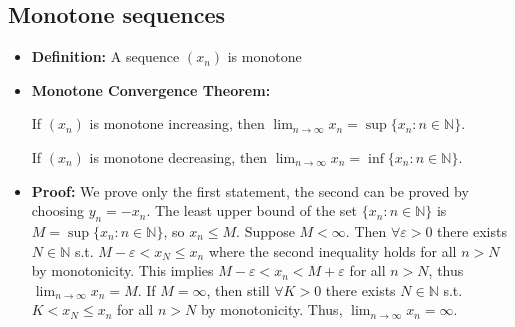\documentclass{article}
\begin{document}
\subsection{Monotone sequences}
    \begin{itemize}
        \item \textbf{Definition:} A sequence $(x_n)$ is monotone
        \item \textbf{Monotone Convergence Theorem:}
        
        If $(x_n)$ is monotone increasing, then $\displaystyle \lim_{n\to\infty} x_n = \sup\{x_n : n \in \mathbb N\}$.

        If $(x_n)$ is monotone decreasing, then $\displaystyle \lim_{n\to\infty} x_n = \inf\{x_n : n \in \mathbb N\}$.
        \item \textbf{Proof:} We prove only the first statement, the second can be proved by choosing $y_n = -x_n$. The least upper bound of the set $\{x_n:n \in \mathbb N\}$ is $M = \sup\{x_n:n \in \mathbb N\}$, so $x_n \le M$. Suppose $M < \infty$. Then $\forall \varepsilon > 0$ there exists $N \in \mathbb N$ s.t. $M - \varepsilon < x_N \le x_n$ where the second inequality holds for all $n > N$ by monotonicity. This implies $M - \varepsilon < x_n < M + \varepsilon$ for all $n > N$, thus $\lim_{n\to\infty} x_n = M$. If $M = \infty$, then still $\forall K > 0$ there exists $N \in \mathbb N$ s.t. $K < x_N \le x_n$ for all $n > N$ by monotonicity. Thus, $\lim_{n\to\infty} x_n = \infty$.
    \end{itemize}
\end{document}
